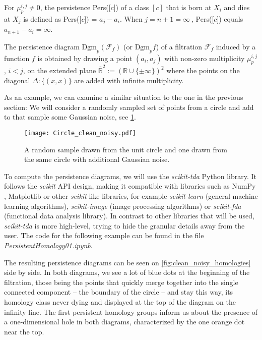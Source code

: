 \begin{definition}
For $\mu^{i,j}_{p} \ne 0$, the persistence Pers([$c$]) of a class $[c]$ that is born at $X_{i}$ and dies at $X_{j}$ is defined as Pers([$c$]) = $a_{j} - a_{i}$. When $j=n+1 = \infty\:$, Pers([$c$]) equals $a_{n+1} - a_{i} = \infty$.
\end{definition}

\begin{definition}
  The persistence diagram $\text{Dgm}_{p}(\mathcal{F}_{f})$ (or $\text{Dgm}_{p}f$) of a filtration $\mathcal{F}_{f}$ induced by a function $f$ is obtained by drawing a point $(a_{i}, a_{j})$ with non-zero multiplicity $\mu^{i,j}_{p}$, $i < j$, on the extended plane $\bar{\mathbb{R}}^{2} := (\mathbb{R} \cup \{\pm \infty\})^{2}$ where the points on the diagonal $\Delta: \{(x,x)\}$ are added with infinite multiplicity.
\end{definition}

As an example, we can examine a similar situation to the one in the previous section: We will consider a randomly sampled set of points from a circle and add to that sample some Gaussian noise, see \ref{fig:noisy_clean_circles}.

\begin{figure}[h!]
  \centering
  \texttt{[image: Circle\_clean\_noisy.pdf]}
  \caption{A random sample drawn from the unit circle and one drawn from the same circle with additional Gaussian noise.}
  \label{fig:noisy_clean_circles}
\end{figure}

To compute the persistence diagrams, we will use the \textit{scikit-tda} \cite{scikittda2019} Python library. It follows the \textit{scikit} API design, making it compatible with libraries such as NumPy \cite{harris2020array}, Matplotlib \cite{Hunter:2007} or other \textit{scikit}-like libraries, for example \textit{scikit-learn} \cite{scikit-learn} (general machine learning algorithms), \textit{scikit-image} \cite{van2014scikit} (image processing algorithms) or \textit{scikit-fda} \cite{ramos-carreno++_2024_scikit-fda} (functional data analysis library). In contrast to other libraries that will be used, \textit{scikit-tda} is more high-level, trying to hide the granular details away from the user. The code for the following example can be found in the file \textit{PersistentHomology01.ipynb}.

\par
The resulting persistence diagrams can be seen on \ref{fig:clean_noisy_homologies} side by side. In both diagrams, we see a lot of blue dots at the beginning of the filtration, those being the points that quickly merge together into the single connected component -- the boundary of the circle -- and stay this way, its homology class never dying and displayed at the top of the diagram on the infinity line. The first persistent homology groups inform us about the presence of a one-dimensional hole in both diagrams, characterized by the one orange dot near the top.

